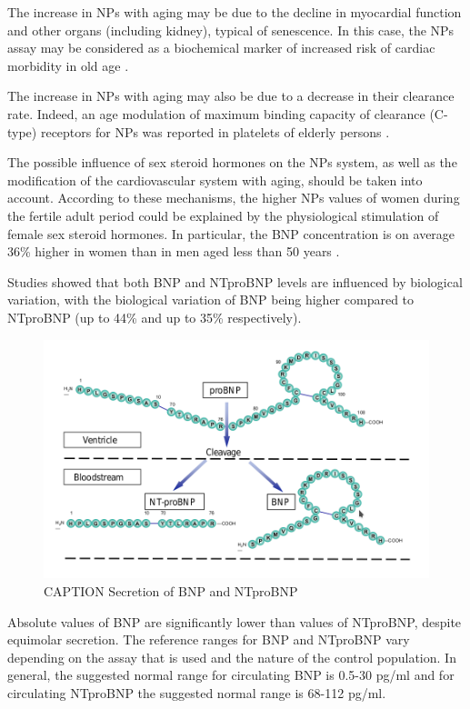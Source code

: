 \documentclass[14pt,a4paper,onecolumn]{extarticle}
\begin{document}
The increase in NPs with aging may be due to the decline in myocardial function and other organs (including kidney), typical of senescence. In this case, the NPs assay may be considered as a biochemical marker of increased risk of cardiac morbidity in old age \citep{bib316}.

The increase in NPs with aging may also be due to a decrease in their clearance rate. Indeed, an age modulation of maximum binding capacity of clearance (C-type) receptors for NPs was reported in platelets of elderly persons \citep{bib317}. %

The possible influence of sex steroid hormones on the NPs system, as well as the modification of the cardiovascular system with aging, should be taken into account. According to these mechanisms, the higher NPs values of women during the fertile adult period could be explained by the physiological stimulation of female sex steroid hormones. In particular, the BNP concentration is on average 36\% higher in women than in men aged less than 50 years \citep{bib37}. %

Studies showed that both BNP and NTproBNP levels are influenced by biological variation, with the biological variation of BNP being higher compared to NTproBNP (up to 44\% and up to 35\% respectively). \citep{Bruins2004}%

\begin{figure}      \centering      \includegraphics[scale=0.4]{../../images/BNP_secretion.png}      \small\caption{CAPTION Secretion of BNP and NTproBNP}      \label{BNP_secretion}  \end{figure} %

Absolute values of BNP are significantly lower than values of NTproBNP, despite equimolar secretion. The reference ranges for BNP and NTproBNP vary depending on the assay that is used and the nature of the control population. In general, the suggested normal range for circulating BNP is 0.5-30 pg/ml and for circulating NTproBNP the suggested normal range is 68-112 pg/ml. \citep{Cowie2003} %
\end{document}
